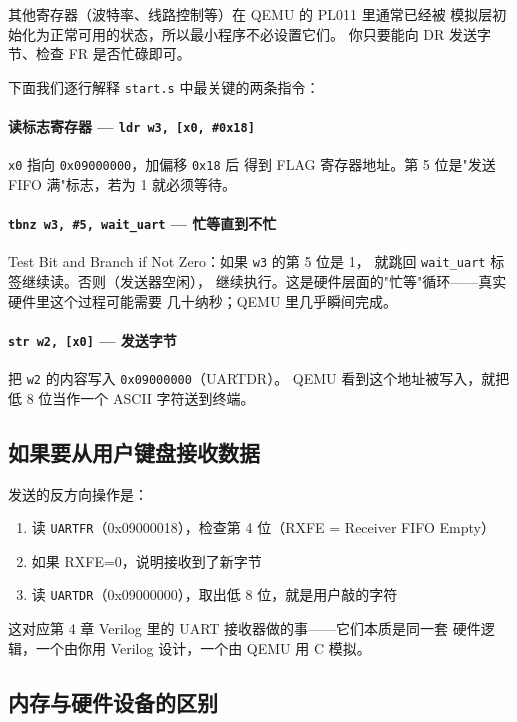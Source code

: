 其他寄存器（波特率、线路控制等）在 QEMU 的 PL011 里通常已经被
模拟层初始化为正常可用的状态，所以最小程序不必设置它们。
你只要能向 DR 发送字节、检查 FR 是否忙碌即可。

下面我们逐行解释 \texttt{start.s} 中最关键的两条指令：

\paragraph{读标志寄存器 — \texttt{ldr w3, [x0, \#0x18]}}
\texttt{x0} 指向 \texttt{0x09000000}，加偏移 \texttt{0x18} 后
得到 FLAG 寄存器地址。第 5 位是"发送 FIFO 满"标志，若为 1 就必须等待。

\paragraph{\texttt{tbnz w3, \#5, wait\_uart} — 忙等直到不忙}
Test Bit and Branch if Not Zero：如果 \texttt{w3} 的第 5 位是 1，
就跳回 \texttt{wait\_uart} 标签继续读。否则（发送器空闲），
继续执行。这是硬件层面的"忙等"循环——真实硬件里这个过程可能需要
几十纳秒；QEMU 里几乎瞬间完成。

\paragraph{\texttt{str w2, [x0]} — 发送字节}
把 \texttt{w2} 的内容写入 \texttt{0x09000000}（UARTDR）。
QEMU 看到这个地址被写入，就把低 8 位当作一个 ASCII 字符送到终端。

\subsection{如果要从用户键盘接收数据}

发送的反方向操作是：
\begin{enumerate}
    \item 读 \texttt{UARTFR}（0x09000018），检查第 4 位（RXFE = Receiver FIFO Empty）
    \item 如果 RXFE=0，说明接收到了新字节
    \item 读 \texttt{UARTDR}（0x09000000），取出低 8 位，就是用户敲的字符
\end{enumerate}

这对应第 4 章 Verilog 里的 UART 接收器做的事——它们本质是同一套
硬件逻辑，一个由你用 Verilog 设计，一个由 QEMU 用 C 模拟。

\subsection{内存与硬件设备的区别}

